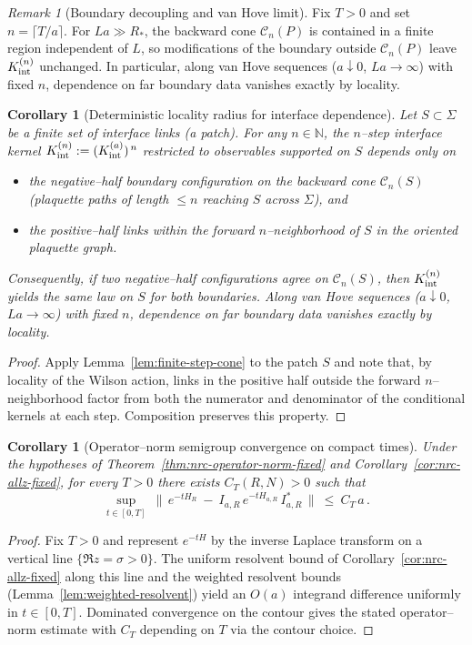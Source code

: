 \documentclass[11pt]{amsart}
\theoremstyle{plain}
\newtheorem{corollary}[theorem]{Corollary}
\theoremstyle{definition}
\theoremstyle{remark}
\newtheorem{remark}[theorem]{Remark}
\begin{document}
\begin{remark}[Boundary decoupling and van Hove limit]\label{rem:cone-decoupling}
Fix $T>0$ and set $n=\lceil T/a\rceil$. For $L a\gg R_*$, the backward cone $\mathcal C_n(P)$ is contained in a finite region independent of $L$, so modifications of the boundary outside $\mathcal C_n(P)$ leave $K^{(n)}_{\rm int}$ unchanged. In particular, along van Hove sequences ($a\downarrow 0$, $La\to\infty$) with fixed $n$, dependence on far boundary data vanishes exactly by locality.
\end{remark}

\begin{corollary}[Deterministic locality radius for interface dependence]\label{cor:deterministic-locality}
Let $S\subset \Sigma$ be a finite set of interface links (a patch). For any $n\in\mathbb N$, the $n$--step interface kernel $K^{(n)}_{\rm int}:=(K_{\rm int}^{(a)})^{\,n}$ restricted to observables supported on $S$ depends only on
\begin{itemize}
  \item the negative--half boundary configuration on the backward cone $\mathcal C_n(S)$ (plaquette paths of length $\le n$ reaching $S$ across $\Sigma$), and
  \item the positive--half links within the forward $n$--neighborhood of $S$ in the oriented plaquette graph.
\end{itemize}
Consequently, if two negative--half configurations agree on $\mathcal C_n(S)$, then $K^{(n)}_{\rm int}$ yields the same law on $S$ for both boundaries. Along van Hove sequences ($a\downarrow 0$, $La\to\infty$) with fixed $n$, dependence on far boundary data vanishes exactly by locality.
\end{corollary}
\begin{proof}
Apply Lemma~\ref{lem:finite-step-cone} to the patch $S$ and note that, by locality of the Wilson action, links in the positive half outside the forward $n$--neighborhood factor from both the numerator and denominator of the conditional kernels at each step. Composition preserves this property.
\end{proof}

\begin{corollary}[Operator--norm semigroup convergence on compact times]\label{cor:semigroup-on-compact}
Under the hypotheses of Theorem~\ref{thm:nrc-operator-norm-fixed} and Corollary~\ref{cor:nrc-allz-fixed}, for every $T>0$ there exists $C_T(R,N)>0$ such that
\[
  \sup_{t\in[0,T]}\ \big\|\,e^{-t H_R}\ -\ I_{a,R}\,e^{-t H_{a,R}}\,I_{a,R}^*\,\big\|\ \le\ C_T\, a\,.
\]
\end{corollary}
\begin{proof}
Fix $T>0$ and represent $e^{-tH}$ by the inverse Laplace transform on a vertical line $\{\Re z=\sigma>0\}$. The uniform resolvent bound of Corollary~\ref{cor:nrc-allz-fixed} along this line and the weighted resolvent bounds (Lemma~\ref{lem:weighted-resolvent}) yield an $O(a)$ integrand difference uniformly in $t\in[0,T]$. Dominated convergence on the contour gives the stated operator--norm estimate with $C_T$ depending on $T$ via the contour choice.
\end{proof}
\end{document}
